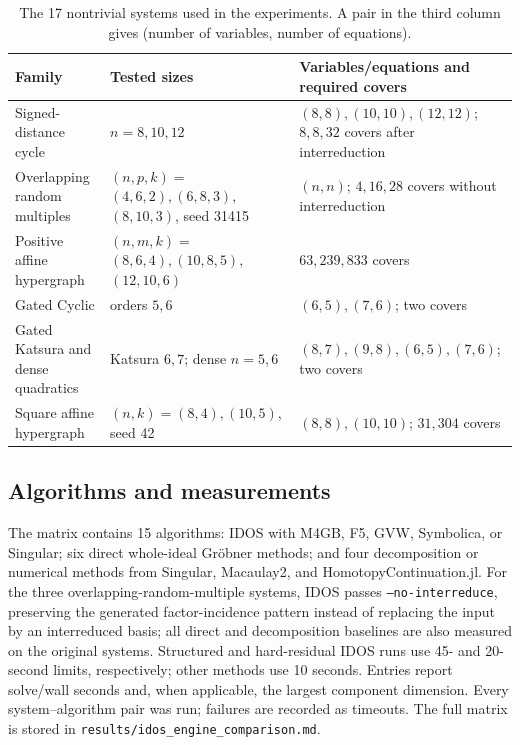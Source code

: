 \documentclass[12pt]{article}
\begin{document}
\begin{table}[t]
\centering
\small
\setlength{\tabcolsep}{4pt}
\begin{tabular}{>{\raggedright\arraybackslash}p{}
                >{\raggedright\arraybackslash}p{}
                >{\raggedright\arraybackslash}p{}}
\toprule
Family & Tested sizes & Variables/equations and required covers \\
\midrule
Signed-distance cycle & $n=8,10,12$ & $(8,8),(10,10),(12,12)$; $8,8,32$ covers after interreduction \\
Overlapping random multiples & $(n,p,k)=$\newline $(4,6,2),(6,8,3),$\newline $(8,10,3)$, seed 31415 & $(n,n)$; $4,16,28$ covers without interreduction \\
Positive affine hypergraph & $(n,m,k)=$\newline $(8,6,4),(10,8,5),$\newline $(12,10,6)$ & $63,239,833$ covers \\
Gated Cyclic & orders $5,6$ & $(6,5),(7,6)$; two covers \\
Gated Katsura and dense quadratics & Katsura $6,7$; dense $n=5,6$ & $(8,7),(9,8),(6,5),(7,6)$; two covers \\
Square affine hypergraph & $(n,k)=(8,4),(10,5)$, seed 42 & $(8,8),(10,10)$; $31,304$ covers \\
\bottomrule
\end{tabular}
\caption{The 17 nontrivial systems used in the experiments.  A pair in the
third column gives (number of variables, number of equations).}
\label{tab:benchmark-families}
\end{table}

\subsection*{Algorithms and measurements}

The matrix contains 15 algorithms: IDOS with M4GB, F5, GVW, Symbolica, or
Singular; six direct whole-ideal Gr\"obner methods; and four decomposition or
numerical methods from Singular, Macaulay2, and HomotopyContinuation.jl.  For
the three overlapping-random-multiple systems, IDOS passes
\texttt{--no-interreduce}, preserving the generated factor-incidence pattern
instead of replacing the input by an interreduced basis; all direct and
decomposition baselines are also measured on the original systems.
Structured and hard-residual IDOS runs use 45- and 20-second limits,
respectively; other methods use 10 seconds.  Entries report solve/wall seconds
and, when applicable, the largest component dimension.  Every
system--algorithm pair was run; failures are recorded as timeouts.  The full
matrix is stored in
\texttt{results/idos\_engine\_comparison.md}.
\end{document}
